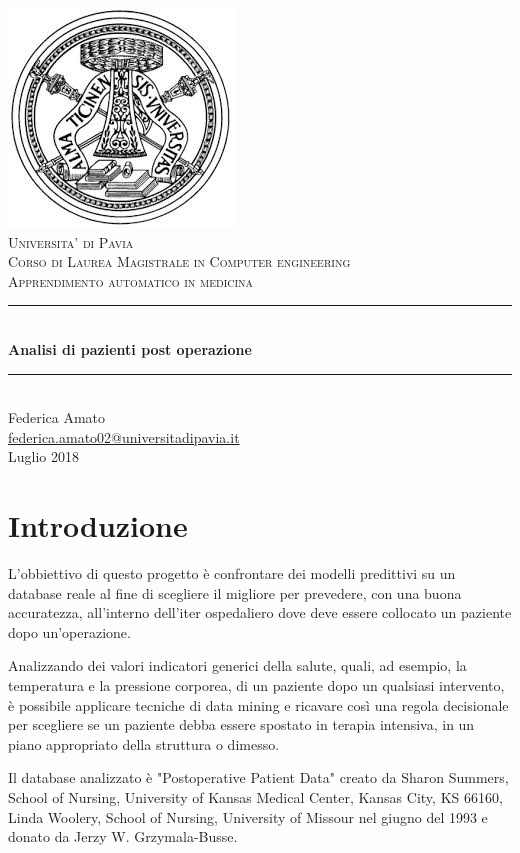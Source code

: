 \documentclass[a4paper, 12p]{report}
\begin{document}
\begin{titlepage}
	\centering
	\includegraphics[scale = 0.4]{img/logo.jpeg}\\[1.0 cm]
	\textsc{\LARGE Universita' di Pavia}\\[1.0 cm]
	\textsc{\LARGE Corso di Laurea Magistrale in Computer engineering}\\[1 cm]
	\textsc{\Large Apprendimento automatico in medicina}\\[0.5 cm]
	\rule{\linewidth}{0.2 mm} \\[0.4 cm]
	{\huge{\textbf{Analisi di pazienti post operazione}}}\\
	\rule{\linewidth}{0.2 mm} \\[1 cm]

	{\large Federica Amato} \\[0.2 cm]
	\url{federica.amato02@universitadipavia.it}
	 \\[0.2 cm]
	{Luglio 2018}
\end{titlepage}

\tableofcontents
\chapter{Introduzione}
L'obbiettivo di questo progetto è confrontare dei modelli predittivi su un database reale al fine di scegliere il migliore per prevedere, con una buona accuratezza, all'interno dell'iter ospedaliero dove deve essere collocato un paziente dopo un'operazione. 

Analizzando dei valori indicatori generici della salute, quali, ad esempio, la temperatura e la pressione corporea, di un paziente dopo un qualsiasi intervento, è possibile applicare tecniche di data mining e ricavare così una regola decisionale per scegliere se un paziente debba essere spostato in terapia intensiva, in un piano appropriato della struttura o dimesso.

Il database analizzato è "Postoperative Patient Data" creato da Sharon Summers, School of Nursing, University of Kansas Medical Center, Kansas City, KS 66160, Linda Woolery, School of Nursing, University of Missour nel giugno del 1993 e donato  da Jerzy W. Grzymala-Busse. 
\end{document}
